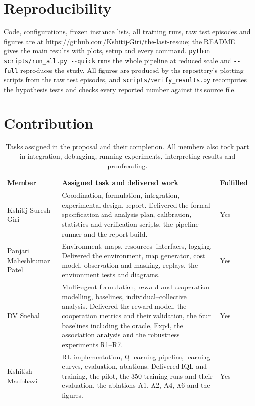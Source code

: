 \documentclass{article}
\begin{document}
\section{Reproducibility}
Code, configurations, frozen instance lists, all training runs, raw test episodes and figures are at
\url{https://github.com/Kshitij-Giri/the-last-rescue}; the README gives the main results with plots, setup and every
command. \texttt{python scripts/run\_all.py -{}-quick} runs the whole pipeline at reduced scale and \texttt{-{}-full}
reproduces the study. All figures are produced by the repository's plotting scripts from the raw test episodes, and
\texttt{scripts/verify\_results.py} recomputes the hypothesis tests and checks every reported number against its
source file.

\section{Contribution}
\begin{table}[h]
\centering\small
\caption{Tasks assigned in the proposal and their completion. All members also took part in integration, debugging,
running experiments, interpreting results and proofreading.}
\label{tab:contrib}
\begin{tabularx}{\linewidth}{@{}p{2.5cm}Lp{1.2cm}@{}}
\toprule
Member & Assigned task and delivered work & Fulfilled \\
\midrule
Kshitij Suresh Giri & Coordination, formulation, integration, experimental design, report. Delivered the formal
specification and analysis plan, calibration, statistics and verification scripts, the pipeline runner and the report
build. & Yes \\
Panjari Maheshkumar Patel & Environment, maps, resources, interfaces, logging. Delivered the environment, map
generator, cost model, observation and masking, replays, the environment tests and diagrams. & Yes \\
DV Snehal & Multi-agent formulation, reward and cooperation modelling, baselines, individual--collective analysis.
Delivered the reward model, the cooperation metrics and their validation, the four baselines including the oracle,
Exp4, the association analysis and the robustness experiments R1--R7. & Yes \\
Kshitish Madbhavi & RL implementation, Q-learning pipeline, learning curves, evaluation, ablations. Delivered IQL and
training, the pilot, the 350 training runs and their evaluation, the ablations A1, A2, A4, A6 and the figures. & Yes \\
\bottomrule
\end{tabularx}
\end{table}
\end{document}
